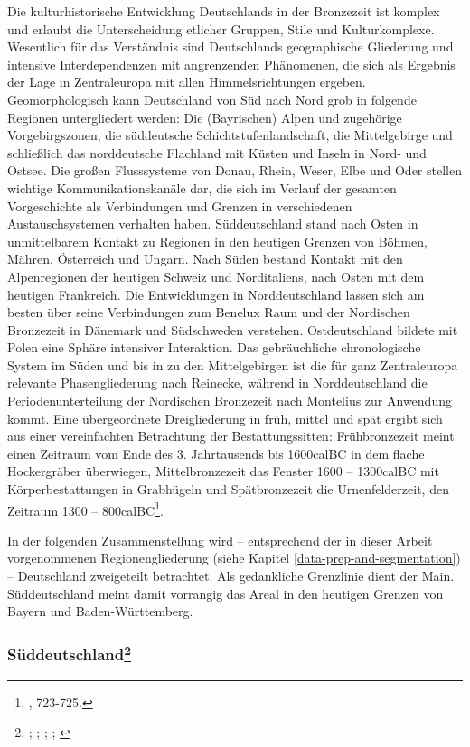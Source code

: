 \documentclass[openany,twoside,twocolumn]{book}
\let\rmarkdownfootnote\footnote%
\def\footnote{\protect\rmarkdownfootnote}
\begin{document}
Die kulturhistorische Entwicklung Deutschlands in der Bronzezeit ist
komplex und erlaubt die Unterscheidung etlicher Gruppen, Stile und
Kulturkomplexe. Wesentlich für das Verständnis sind Deutschlands
geographische Gliederung und intensive Interdependenzen mit angrenzenden
Phänomenen, die sich als Ergebnis der Lage in Zentraleuropa mit allen
Himmelsrichtungen ergeben. Geomorphologisch kann Deutschland von Süd
nach Nord grob in folgende Regionen untergliedert werden: Die
(Bayrischen) Alpen und zugehörige Vorgebirgszonen, die süddeutsche
Schichtstufenlandschaft, die Mittelgebirge und schließlich das
norddeutsche Flachland mit Küsten und Inseln in Nord- und Ostsee. Die
großen Flusssysteme von Donau, Rhein, Weser, Elbe und Oder stellen
wichtige Kommunikationskanäle dar, die sich im Verlauf der gesamten
Vorgeschichte als Verbindungen und Grenzen in verschiedenen
Austauschsystemen verhalten haben. Süddeutschland stand nach Osten in
unmittelbarem Kontakt zu Regionen in den heutigen Grenzen von Böhmen,
Mähren, Österreich und Ungarn. Nach Süden bestand Kontakt mit den
Alpenregionen der heutigen Schweiz und Norditaliens, nach Osten mit dem
heutigen Frankreich. Die Entwicklungen in Norddeutschland lassen sich am
besten über seine Verbindungen zum Benelux Raum und der Nordischen
Bronzezeit in Dänemark und Südschweden verstehen. Ostdeutschland bildete
mit Polen eine Sphäre intensiver Interaktion. Das gebräuchliche
chronologische System im Süden und bis in zu den Mittelgebirgen ist die
für ganz Zentraleuropa relevante Phasengliederung nach Reinecke, während
in Norddeutschland die Periodenunterteilung der Nordischen Bronzezeit
nach Montelius zur Anwendung kommt. Eine übergeordnete Dreigliederung in
früh, mittel und spät ergibt sich aus einer vereinfachten Betrachtung
der Bestattungssitten: Frühbronzezeit meint einen Zeitraum vom Ende des
3. Jahrtausends bis 1600calBC in dem flache Hockergräber überwiegen,
Mittelbronzezeit das Fenster 1600 -- 1300calBC mit Körperbestattungen in
Grabhügeln und Spätbronzezeit die Urnenfelderzeit, den Zeitraum 1300 --
800calBC\footnote{\textcite{jockenhovel_germany_2013}, 723-725.}.

In der folgenden Zusammenstellung wird -- entsprechend der in dieser
Arbeit vorgenommenen Regionengliederung (siehe Kapitel
\ref{data-prep-and-segmentation}) -- Deutschland zweigeteilt betrachtet.
Als gedankliche Grenzlinie dient der Main. Süddeutschland meint damit
vorrangig das Areal in den heutigen Grenzen von Bayern und
Baden-Württemberg.

\hypertarget{suddeutschland}{%
\subsubsection[Süddeutschland]{\texorpdfstring{Süddeutschland\footnote{\textcite{falkenstein_development_2012};
  \textcite{falkenstein_zum_2017}; \textcite{jockenhovel_germany_2013};
  \textcite{kreutle_urnenfelderkultur_2007};
  \textcite{wiesner_grabbau_2009}}}{Süddeutschland}}\label{suddeutschland}}
\end{document}
